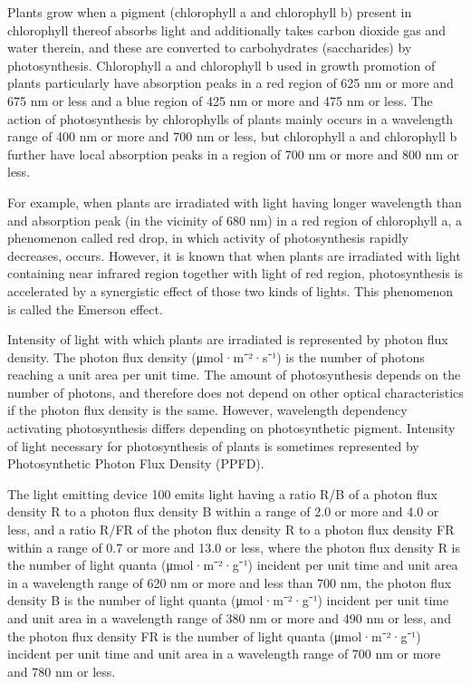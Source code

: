 \documentclass[11pt,a4paper]{article}
\begin{document}
Plants grow when a pigment (chlorophyll a and chlorophyll b) present in chlorophyll thereof absorbs light and additionally takes carbon dioxide gas and water therein, and these are converted to carbohydrates (saccharides) by photosynthesis. Chlorophyll a and chlorophyll b used in growth promotion of plants particularly have absorption peaks in a red region of 625 nm or more and 675 nm or less and a blue region of 425 nm or more and 475 nm or less. The action of photosynthesis by chlorophylls of plants mainly occurs in a wavelength range of 400 nm or more and 700 nm or less, but chlorophyll a and chlorophyll b further have local absorption peaks in a region of 700 nm or more and 800 nm or less.

For example, when plants are irradiated with light having longer wavelength than and absorption peak (in the vicinity of 680 nm) in a red region of chlorophyll a, a phenomenon called red drop, in which activity of photosynthesis rapidly decreases, occurs. However, it is known that when plants are irradiated with light containing near infrared region together with light of red region, photosynthesis is accelerated by a synergistic effect of those two kinds of lights. This phenomenon is called the Emerson effect.

Intensity of light with which plants are irradiated is represented by photon flux density. The photon flux density (μmol·m⁻²·s⁻¹) is the number of photons reaching a unit area per unit time. The amount of photosynthesis depends on the number of photons, and therefore does not depend on other optical characteristics if the photon flux density is the same. However, wavelength dependency activating photosynthesis differs depending on photosynthetic pigment. Intensity of light necessary for photosynthesis of plants is sometimes represented by Photosynthetic Photon Flux Density (PPFD).

The light emitting device 100 emits light having a ratio R/B of a photon flux density R to a photon flux density B within a range of 2.0 or more and 4.0 or less, and a ratio R/FR of the photon flux density R to a photon flux density FR within a range of 0.7 or more and 13.0 or less, where the photon flux density R is the number of light quanta (μmol·m⁻²·g⁻¹) incident per unit time and unit area in a wavelength range of 620 nm or more and less than 700 nm, the photon flux density B is the number of light quanta (μmol·m⁻²·g⁻¹) incident per unit time and unit area in a wavelength range of 380 nm or more and 490 nm or less, and the photon flux density FR is the number of light quanta (μmol·m⁻²·g⁻¹) incident per unit time and unit area in a wavelength range of 700 nm or more and 780 nm or less.
\end{document}
